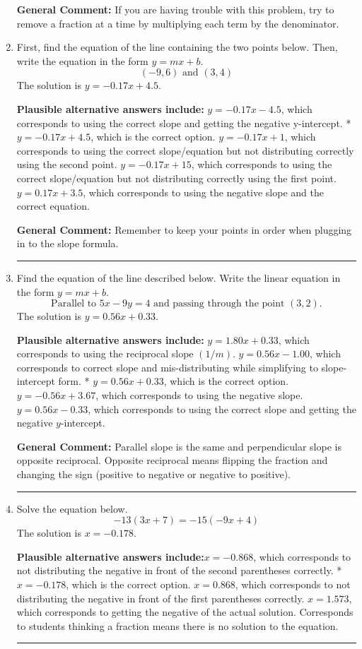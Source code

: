 \documentclass{extbook}[14pt]
\newcommand{\litem}[1]{\item #1

\rule{\textwidth}{0.4pt}}
\begin{document}
\begin{enumerate}
{\textbf{General Comment:} If you are having trouble with this problem, try to remove a fraction at a time by multiplying each term by the denominator.
}
\litem{
First, find the equation of the line containing the two points below. Then, write the equation in the form $ y=mx+b $.
\[ (-9, 6) \text{ and } (3, 4) \]The solution is \( y = -0.17x + 4.5 \).\begin{enumerate}[label=\Alph*.]
\textbf{Plausible alternative answers include:} $y = -0.17x -4.5$, which corresponds to using the correct slope and getting the negative y-intercept.
* $y = -0.17x + 4.5$, which is the correct option.
 $y = -0.17x + 1$, which corresponds to using the correct slope/equation but not distributing correctly using the second point.
 $y = -0.17x + 15$, which corresponds to using the correct slope/equation but not distributing correctly using the first point.
 $y = 0.17x + 3.5$, which corresponds to using the negative slope and the correct equation.
\end{enumerate}

\textbf{General Comment:} Remember to keep your points in order when plugging in to the slope formula.
}
\litem{
Find the equation of the line described below. Write the linear equation in the form $y=mx+b$.
\[ \text{Parallel to } 5 x - 9 y = 4 \text{ and passing through the point } (3, 2). \]The solution is \( y = 0.56x + 0.33 \).\begin{enumerate}[label=\Alph*.]
\textbf{Plausible alternative answers include:} $y = 1.80x + 0.33$, which corresponds to using the reciprocal slope $(1/m)$.
 $y = 0.56x - 1.00$, which corresponds to correct slope and mis-distributing while simplifying to slope-intercept form.
* $y = 0.56x + 0.33$, which is the correct option.
 $y = -0.56x + 3.67$, which corresponds to using the negative slope.
 $y = 0.56x - 0.33$, which corresponds to using the correct slope and getting the negative $y$-intercept.
\end{enumerate}

\textbf{General Comment:} Parallel slope is the same and perpendicular slope is opposite reciprocal. Opposite reciprocal means flipping the fraction and changing the sign (positive to negative or negative to positive).
}
\litem{
Solve the equation below.
\[ -13(3x + 7) = -15(-9x + 4) \]The solution is \( x = -0.178 \).\begin{enumerate}[label=\Alph*.]
\textbf{Plausible alternative answers include:}$x = -0.868$, which corresponds to not distributing the negative in front of the second parentheses correctly.
* $x = -0.178$, which is the correct option.
$x = 0.868$, which corresponds to not distributing the negative in front of the first parentheses correctly.
$x = 1.573$, which corresponds to getting the negative of the actual solution.
Corresponds to students thinking a fraction means there is no solution to the equation.
\end{enumerate}

}
\end{enumerate}
\end{document}
